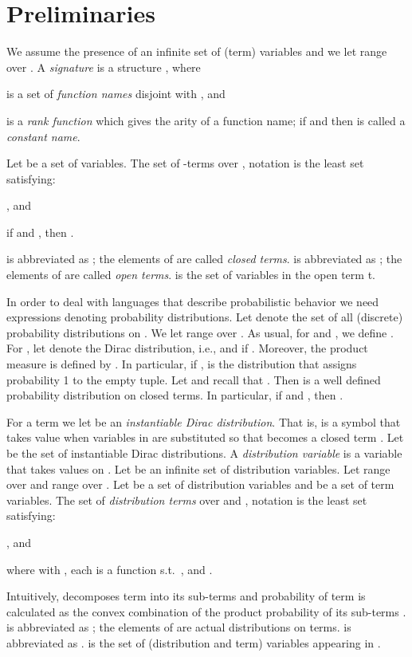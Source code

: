 \documentclass[submission,copyright,creativecommons]{eptcs}
\begin{document}
\section{Preliminaries}\label{sec:preliminaries}






We assume the presence of an infinite set of (term) variables  and
we let   range over .
A \emph{signature} is a structure , where 
\begin{inparaenum}[(i)]
\item  is a set of \emph{function names} disjoint with , and
\item  is a \emph{rank function} which gives the arity 
  of a function name; if  and  then  is called
  a \emph{constant name}.
\end{inparaenum}
Let  be a set of variables. The set of -terms 
over , notation  is the least set satisfying: 
\begin{inparaenum}[(i)]
\item , and
\item if  and , then
  .
\end{inparaenum}
 is abbreviated as ; the elements
of  are called \emph{closed terms}.  is
abbreviated as ; the elements of  are called
\emph{open terms}.  is the set of variables in
the open term t. 



In order to deal with languages that describe probabilistic behavior we need expressions denoting probability distributions.
Let  denote the set of all (discrete) probability
distributions on .
We let  range over
.
As usual, for  and , we define .
For , let  denote the Dirac
distribution, i.e.,  and   if .
Moreover, the product measure  is defined by
. In
particular, if ,  is
the distribution that assigns probability 1 to the empty tuple.
Let  and recall that 
.  Then
 is a well defined probability
distribution on closed terms.
In particular, if  and , 
then .


For a term  we let  be an
\emph{instantiable Dirac distribution}. That is,  is a
symbol that takes value  when variables in 
are substituted so that  becomes a closed term .
Let  be the set of
instantiable Dirac distributions.
A \emph{distribution variable} is a variable that takes values on
.  Let  be an infinite set of distribution
variables. Let  range over 
and  range over .
Let  be a set of distribution variables and  be a set of term variables.  
The set of \emph{distribution terms} over  and , notation  is the least set satisfying: 
\begin{inparaenum}[(i)]
\item , and
\item  where
     with ,
each  is a
function s.t.\ ,
  and
.
\end{inparaenum}
Intuitively,  decomposes term  into its sub-terms  and probability  of term  is calculated as the convex combination of the product probability of its sub-terms .
 is abbreviated as ; the elements
of  are actual distributions on terms.  is
abbreviated as .
 is the set of  
(distribution and term) variables appearing in .
\end{document}
